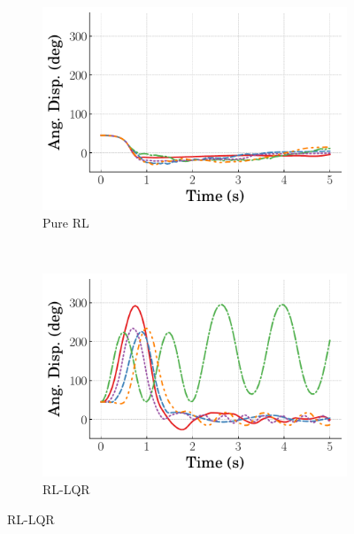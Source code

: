 %
\begin{figure}[tb]
    \centering
    \begin{subfigure}[b]{0.49\textwidth}
        \centering
        \includegraphics[width=\textwidth]{figures/figures_RL_model_based_control/time_responses_invpend/invpend_pure_RL/Angular_displacement_45_init_300000_steps.pdf}
        \caption{Pure RL}
        \label{subfig_chap2:invpend_near_resp_300000steps_pure_RL}
    \end{subfigure}\\
    \hfill
    \begin{subfigure}[b]{0.49\textwidth}
        \centering
        \includegraphics[width=\textwidth]{figures/figures_RL_model_based_control/time_responses_invpend/invpend_RL_LQR/Angular_displacement_45_init_300000_steps.pdf}
        \caption{RL-LQR}
        \label{subfig_chap2:invpend_near_resp_300000steps_RL_LQR}
    \end{subfigure}

\end{figure}
